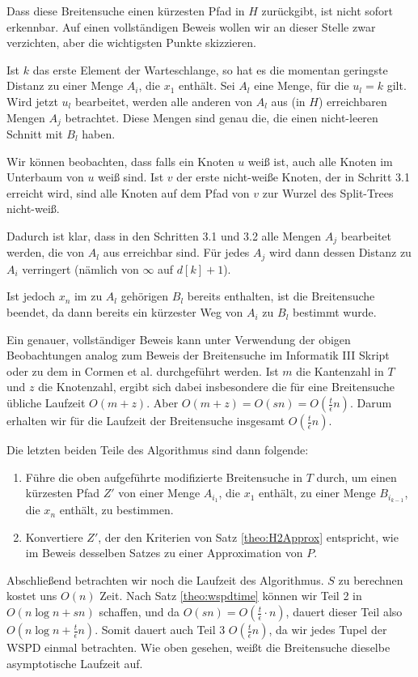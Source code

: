     Dass diese Breitensuche einen kürzesten Pfad in $H$ zurückgibt, ist nicht sofort erkennbar. 
    Auf einen vollständigen Beweis wollen wir an dieser Stelle zwar verzichten, aber die wichtigsten Punkte skizzieren. 
    
    Ist $k$ das erste Element der Warteschlange, so hat es die momentan geringste Distanz zu einer Menge $A_i$, die $x_1$ enthält. Sei $A_l$ eine Menge, für die $u_l = k$ gilt. Wird jetzt $u_l$ bearbeitet, werden alle anderen von $A_l$ aus (in $H$) erreichbaren Mengen $A_j$ betrachtet. Diese Mengen sind genau die, die einen nicht-leeren Schnitt mit $B_l$ haben. 
    
	Wir können beobachten, dass falls ein Knoten $u$ weiß ist, auch alle Knoten im Unterbaum von $u$ weiß sind. Ist $v$ der erste nicht-weiße Knoten, der in Schritt 3.1 erreicht wird, sind alle Knoten auf dem Pfad von $v$ zur Wurzel des Split-Trees nicht-weiß.
    
    Dadurch ist klar, dass in den Schritten 3.1 und 3.2 alle Mengen $A_j$ bearbeitet werden, die von $A_l$ aus erreichbar sind.
    Für jedes $A_j$ wird dann dessen Distanz zu $A_i$ verringert (nämlich von $\infty$ auf $d[k]+1$). 
    
    Ist jedoch $x_n$ im zu $A_l$ gehörigen $B_l$ bereits enthalten, ist die Breitensuche beendet, da dann bereits ein kürzester Weg von $A_i$ zu $B_l$ bestimmt wurde.
    
    Ein genauer, vollständiger Beweis kann unter Verwendung der obigen Beobachtungen analog zum Beweis der Breitensuche im Informatik III Skript \cite{hagerup} oder zu dem in Cormen et al. \cite{cormen} durchgeführt werden. 
    Ist $m$ die Kantenzahl in $T$ und $z$ die Knotenzahl, ergibt sich dabei insbesondere die für eine Breitensuche übliche Laufzeit $O(m + z)$. 
    Aber $O(m + z) = O(sn) = O(\frac{t}{\epsilon}n)$. Darum erhalten wir für die Laufzeit der Breitensuche insgesamt $O(\frac{t}{\epsilon}n)$.
    
    Die letzten beiden Teile des Algorithmus sind dann folgende:
    \begin{enumerate}[start=4, topsep=4mm]
    	\item Führe die oben aufgeführte modifizierte Breitensuche in $T$ durch, um einen kürzesten Pfad $Z'$ von einer Menge $A_{i_1}$, die $x_1$ enthält, zu einer Menge $B_{i_{k-1}}$, die $x_n$ enthält, zu bestimmen.
    	\item Konvertiere $Z'$, der den Kriterien von Satz \ref{theo:H2Approx} entspricht, wie im Beweis desselben Satzes zu einer Approximation von $P$.
    \end{enumerate}
    Abschließend betrachten wir noch die Laufzeit des Algorithmus. $S$ zu berechnen kostet uns $O(n)$ Zeit. 
    Nach Satz \ref{theo:wspdtime} können wir Teil 2 in $O(n \log n + sn)$ schaffen, und da $O(sn) = O(\frac{t}{\epsilon}\cdot n)$, dauert dieser Teil also $O(n \log n + \frac{t}{\epsilon}n)$. 
    Somit dauert auch Teil 3 $O(\frac{t}{\epsilon}n)$, da wir jedes Tupel der WSPD einmal betrachten. 
    Wie oben gesehen, weißt die Breitensuche dieselbe asymptotische Laufzeit auf. 
    
